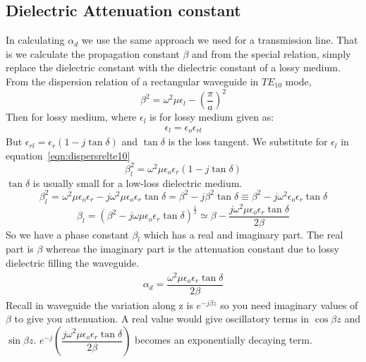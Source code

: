 \subsection{Dielectric Attenuation constant}
In calculating  $\alpha_{d}$ we use the same approach we used for a transmission line. That is we calculate the propagation constant $\beta$ and from the special relation, simply replace the dielectric constant with the dielectric constant of a lossy medium. From the dispersion relation of a rectangular waveguide in $TE_{10}$ mode,
\begin{equation}
\beta^{2} = \omega^{2}\mu\epsilon_{l} -\left(\frac{\pi}{a}\right)^{2}
\label{eqn:dispersrelte10}
\end{equation}
Then for lossy medium, where $\epsilon_{l}$ is for lossy medium given as:
\begin{align*}
\epsilon_{l} = \epsilon_{o}\epsilon_{rl}
\end{align*}
But $\epsilon_{rl} = \epsilon_{r}(1-j\tan\delta)$ and $\tan\delta$ is the loss tangent. We substitute for $\epsilon_{l}$ in equation~\ref{eqn:dispersrelte10} 
\begin{equation*}
\beta^{2}_{l} = \omega^{2}\mu\epsilon_{o}\epsilon_{r}(1-j\tan\delta)
\end{equation*}
$\tan\delta$ is usually small for a low-loss dielectric medium.
\begin{dmath*}
\beta^{2}_{l} = \omega^{2}\mu\epsilon_{o}\epsilon_{r} - j\omega^{2}\mu\epsilon_{o}\epsilon_{r}\tan\delta = \beta^{2} - j\beta^{2}\tan\delta \equiv \beta^{2} - j\omega^{2}\epsilon_{o}\epsilon_{r}\tan\delta
\end{dmath*}
\begin{dmath}
\beta_{l} = (\beta^{2} - j\omega\mu\epsilon_{o}\epsilon_{r}\tan\delta)^{\frac{1}{2}} \simeq \beta - \dfrac{j\omega^{2}\mu\epsilon_{o}\epsilon_{r}\tan\delta}{2\beta}
\end{dmath}
So we have a phase constant $\beta_{l}$ which has a real and imaginary part. The real part is $\beta$ whereas the imaginary part is the attenuation constant due to lossy dielectric filling the waveguide.
\begin{align}
\alpha_{d} = \dfrac{\omega^{2}\mu\epsilon_{o}\epsilon_{r}\tan\delta}{2\beta}
\end{align}
Recall in waveguide the variation along z is $e^{-j\beta z}$ so you need imaginary values of $\beta$ to give you attenuation. A real value would give oscillatory terms in $\cos\beta z$ and $\sin\beta z$. $e^{-j}(\dfrac{j\omega^{2} \mu\epsilon_{o}\epsilon_{r}\tan\delta}{2\beta})$ becomes an exponentially decaying term.

